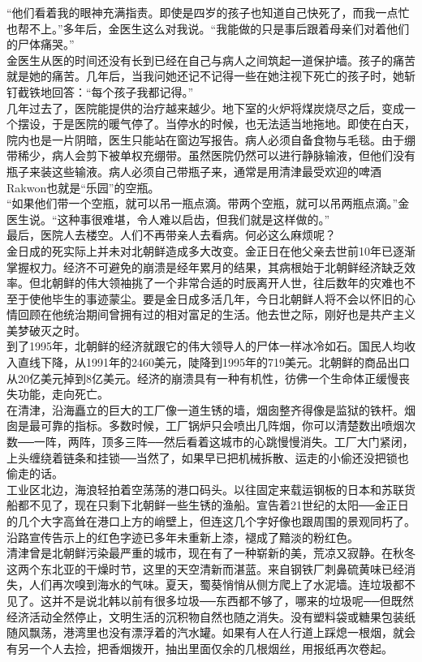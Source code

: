 “他们看着我的眼神充满指责。即使是四岁的孩子也知道自己快死了，而我一点忙也帮不上。”多年后，金医生这么对我说。“我能做的只是事后跟着母亲们对着他们的尸体痛哭。”\\

金医生从医的时间还没有长到已经在自己与病人之间筑起一道保护墙。孩子的痛苦就是她的痛苦。几年后，当我问她还记不记得一些在她注视下死亡的孩子时，她斩钉截铁地回答：“每个孩子我都记得。”\\

几年过去了，医院能提供的治疗越来越少。地下室的火炉将煤炭烧尽之后，变成一个摆设，于是医院的暖气停了。当停水的时候，也无法适当地拖地。即使在白天，院内也是一片阴暗，医生只能站在窗边写报告。病人必须自备食物与毛毯。由于绷带稀少，病人会剪下被单权充绷带。虽然医院仍然可以进行静脉输液，但他们没有瓶子来装这些输液。病人必须自己带瓶子来，通常是用清津最受欢迎的啤酒Rakwon也就是“乐园”的空瓶。\\

“如果他们带一个空瓶，就可以吊一瓶点滴。带两个空瓶，就可以吊两瓶点滴。”金医生说。“这种事很难堪，令人难以启齿，但我们就是这样做的。”\\

最后，医院人去楼空。人们不再带亲人去看病。何必这么麻烦呢？\\

金日成的死实际上并未对北朝鲜造成多大改变。金正日在他父亲去世前10年已逐渐掌握权力。经济不可避免的崩溃是经年累月的结果，其病根始于北朝鲜经济缺乏效率。但北朝鲜的伟大领袖挑了一个非常合适的时辰离开人世，往后数年的灾难也不至于使他毕生的事迹蒙尘。要是金日成多活几年，今日北朝鲜人将不会以怀旧的心情回顾在他统治期间曾拥有过的相对富足的生活。他去世之际，刚好也是共产主义美梦破灭之时。\\

到了1995年，北朝鲜的经济就跟它的伟大领导人的尸体一样冰冷如石。国民人均收入直线下降，从1991年的2460美元，陡降到1995年的719美元。北朝鲜的商品出口从20亿美元掉到8亿美元。经济的崩溃具有一种有机性，彷佛一个生命体正缓慢丧失功能，走向死亡。\\

在清津，沿海矗立的巨大的工厂像一道生锈的墙，烟囱整齐得像是监狱的铁杆。烟囱是最可靠的指标。多数时候，工厂锅炉只会喷出几阵烟，你可以清楚数出喷烟次数──一阵，两阵，顶多三阵──然后看着这城市的心跳慢慢消失。工厂大门紧闭，上头缠绕着链条和挂锁──当然了，如果早已把机械拆散、运走的小偷还没把锁也偷走的话。\\

工业区北边，海浪轻拍着空荡荡的港口码头。以往固定来载运钢板的日本和苏联货船都不见了，现在只剩下北朝鲜一些生锈的渔船。宣告着21世纪的太阳──金正日的几个大字高耸在港口上方的峭壁上，但连这几个字好像也跟周围的景观同朽了。沿路宣传告示上的红色字迹已多年未重新上漆，褪成了黯淡的粉红色。\\

清津曾是北朝鲜污染最严重的城市，现在有了一种崭新的美，荒凉又寂静。在秋冬这两个东北亚的干燥时节，这里的天空清新而湛蓝。来自钢铁厂刺鼻硫黄味已经消失，人们再次嗅到海水的气味。夏天，蜀葵悄悄从侧方爬上了水泥墙。连垃圾都不见了。这并不是说北韩以前有很多垃圾──东西都不够了，哪来的垃圾呢──但既然经济活动全然停止，文明生活的沉积物自然也随之消失。没有塑料袋或糖果包装纸随风飘荡，港湾里也没有漂浮着的汽水罐。如果有人在人行道上踩熄一根烟，就会有另一个人去捡，把香烟拨开，抽出里面仅余的几根烟丝，用报纸再次卷起。\\